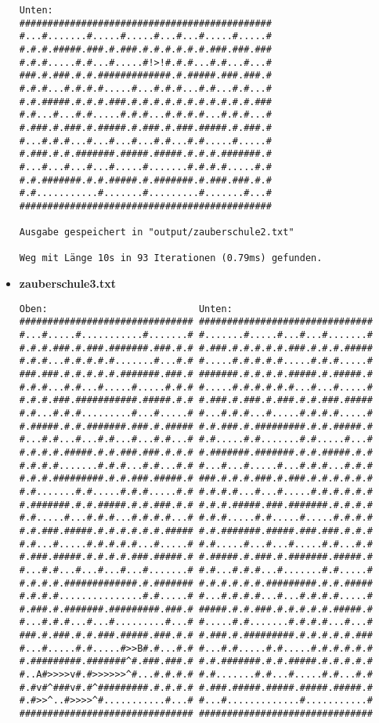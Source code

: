 \documentclass[a4paper,12pt]{scrartcl}
\theoremstyle{definition}
\begin{document}
\begin{itemize}
\begin{verbatim}
Unten:
#############################################
#...#.......#.....#.....#...#...#.....#.....#
#.#.#.#####.###.#.###.#.#.#.#.#.#.###.###.###
#.#.#.....#.#...#.....#!>!#.#.#...#.#...#...#
###.#.###.#.#.#############.#.#####.###.###.#
#.#.#...#.#.#.#.....#...#.#.#...#.#...#.#...#
#.#.#####.#.#.#.###.#.#.#.#.#.#.#.#.#.#.#.###
#.#...#...#.#.....#.#.#...#.#.#.#...#.#.#...#
#.###.#.###.#.#####.#.###.#.###.#####.#.###.#
#...#.#.#...#...#...#...#.#...#.#.....#.....#
#.###.#.#.#######.#####.#####.#.#.#.#######.#
#...#...#...#...#.....#.......#.#.#.#.....#.#
#.#.#######.#.#.#####.#.#######.#.###.###.#.#
#.#...........#.......#.........#.......#...#
#############################################

Ausgabe gespeichert in "output/zauberschule2.txt"

Weg mit Länge 10s in 93 Iterationen (0.79ms) gefunden.
	\end{verbatim}
	\newpage
	\item \textbf{zauberschule3.txt}\begin{verbatim}
Oben:                           Unten:
############################### ###############################
#...#.....#...........#.......# #.......#.....#...#...#.......#
#.#.#.###.#.###.#######.###.#.# #.###.#.#.#.#.#.###.#.#.#.#####
#.#.#...#.#.#.#.#.......#...#.# #.....#.#.#.#.#.....#.#.#.....#
###.###.#.#.#.#.#.#######.###.# #######.#.#.#.#.#####.#.#####.#
#.#.#...#.#...#.....#.....#.#.# #.....#.#.#.#.#.#...#...#.....#
#.#.#.###.###########.#####.#.# #.###.#.###.#.###.#.#.###.#####
#.#...#.#.#.........#...#.....# #...#.#.#...#.....#.#.#.#.....#
#.#####.#.#.#######.###.#.##### #.#.###.#.#########.#.#.#####.#
#...#.#...#...#.#...#...#.#...# #.#.....#.#.......#.#.....#...#
#.#.#.#.#####.#.#.###.###.#.#.# #.#######.#######.#.#.#####.#.#
#.#.#.#.......#.#.#...#.#...#.# #...#...#.....#...#.#.#...#.#.#
#.#.#.#########.#.#.###.#####.# ###.#.#.#.###.#.###.#.#.#.#.#.#
#.#.......#.#.....#.#.#.....#.# #.#.#.#...#...#.....#.#.#.#.#.#
#.#######.#.#.#####.#.#.###.#.# #.#.#.#####.###.#######.#.#.#.#
#.#.....#...#.#.#...#.#.#.#...# #.#.#.....#.#.....#.....#.#.#.#
#.#.###.#####.#.#.#.#.#.#.##### #.#.#######.#####.###.###.#.#.#
#.#...#.....#.#.#.#.#...#.....# #.#.....#...#...#.....#.#...#.#
#.###.#####.#.#.#.#.###.#####.# #.#####.#.###.#.#######.#####.#
#...#.#...#...#...#...#.......# #.#...#.#.#...#.......#.#.....#
#.#.#.#.#############.#.####### #.#.#.#.#.#.#########.#.#.#####
#.#.#.#...............#.#.....# #...#.#.#.#...#...#.#.#.#.....#
#.###.#.#######.#########.###.# #####.#.#.###.#.#.#.#.#.#####.#
#...#.#.#...#...#.........#...# #.....#.#.......#.#.#.#...#...#
###.#.###.#.#.###.#####.###.#.# #.###.#.#########.#.#.#.#.#.###
#...#.....#.#.....#>>B#.#...#.# #...#.#.....#.#.....#.#.#.#.#.#
#.#########.#######^#.###.###.# #.#.#######.#.#.#####.#.#.#.#.#
#..A#>>>>v#.#>>>>>>^#...#.#.#.# #.#.......#.#...#.....#.#...#.#
#.#v#^###v#.#^#########.#.#.#.# #.###.#####.#####.#####.#####.#
#.#>>^..#>>>>^#...........#...# #...#.............#...........#
############################### ###############################


\end{verbatim}
\end{itemize}
\end{document}

